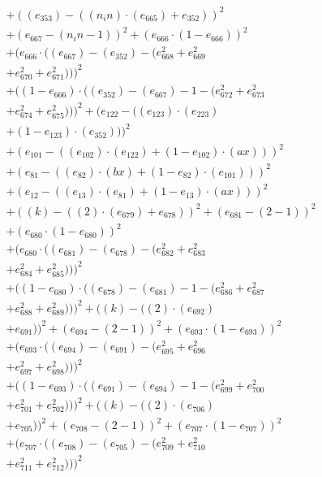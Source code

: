 \documentclass[10pt, a4paper]{article}
\begin{document}
\begin{small}
\begin{align*}
& + ((e_{353}) - ((n_in)  \cdot  (e_{665}) + e_{352}))^{2} \\
& + (e_{667} - (n_in - 1))^{2} + (e_{666}  \cdot  (1 - e_{666}))^{2} \\
& + (e_{666}  \cdot  ((e_{667}) - (e_{352}) - (e_{668}^{2} + e_{669}^{2} \\
& + e_{670}^{2} + e_{671}^{2})))^{2} \\
& + ((1 - e_{666})  \cdot  ((e_{352}) - (e_{667}) - 1 - (e_{672}^{2} + e_{673}^{2} \\
& + e_{674}^{2} + e_{675}^{2})))^{2} + (e_{122} - ((e_{123})  \cdot  (e_{223}) \\
& + (1 - e_{123})  \cdot  (e_{352})))^{2} \\
& + (e_{101} - ((e_{102})  \cdot  (e_{122}) + (1 - e_{102})  \cdot  (ax)))^{2} \\
& + (e_{81} - ((e_{82})  \cdot  (bx) + (1 - e_{82})  \cdot  (e_{101})))^{2} \\
& + (e_{12} - ((e_{13})  \cdot  (e_{81}) + (1 - e_{13})  \cdot  (ax)))^{2} \\
& + ((k) - ((2)  \cdot  (e_{679}) + e_{678}))^{2} + (e_{681} - (2 - 1))^{2} \\
& + (e_{680}  \cdot  (1 - e_{680}))^{2} \\
& + (e_{680}  \cdot  ((e_{681}) - (e_{678}) - (e_{682}^{2} + e_{683}^{2} \\
& + e_{684}^{2} + e_{685}^{2})))^{2} \\
& + ((1 - e_{680})  \cdot  ((e_{678}) - (e_{681}) - 1 - (e_{686}^{2} + e_{687}^{2} \\
& + e_{688}^{2} + e_{689}^{2})))^{2} + ((k) - ((2)  \cdot  (e_{692}) \\
& + e_{691}))^{2} + (e_{694} - (2 - 1))^{2} + (e_{693}  \cdot  (1 - e_{693}))^{2} \\
& + (e_{693}  \cdot  ((e_{694}) - (e_{691}) - (e_{695}^{2} + e_{696}^{2} \\
& + e_{697}^{2} + e_{698}^{2})))^{2} \\
& + ((1 - e_{693})  \cdot  ((e_{691}) - (e_{694}) - 1 - (e_{699}^{2} + e_{700}^{2} \\
& + e_{701}^{2} + e_{702}^{2})))^{2} + ((k) - ((2)  \cdot  (e_{706}) \\
& + e_{705}))^{2} + (e_{708} - (2 - 1))^{2} + (e_{707}  \cdot  (1 - e_{707}))^{2} \\
& + (e_{707}  \cdot  ((e_{708}) - (e_{705}) - (e_{709}^{2} + e_{710}^{2} \\
& + e_{711}^{2} + e_{712}^{2})))^{2} \\

\end{align*}
\end{small}
\end{document}
